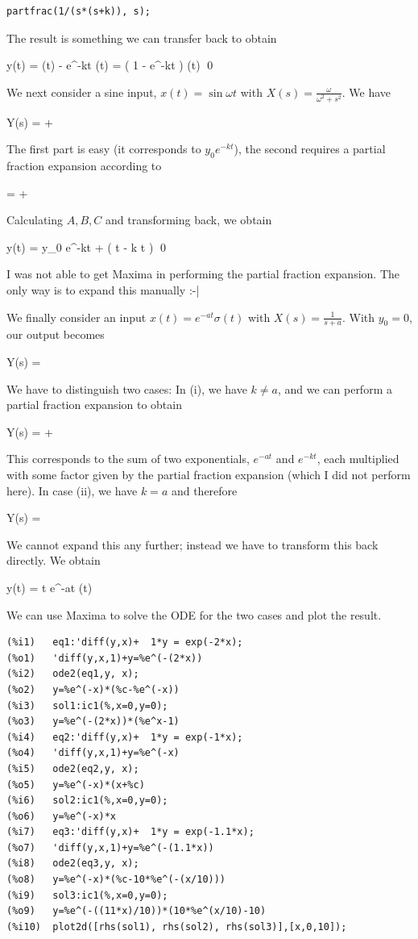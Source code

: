 \begin{verbatim}
partfrac(1/(s*(s+k)), s);
\end{verbatim}

The result is something we can transfer back to obtain

\bee
y(t) = \sigma(t) -  e^{-kt} \sigma(t) =  \left( 1 - e^{-kt} \right) \sigma(t) \qed
\eee

We next consider a sine input, $x(t) = \sin \omega t$ with $X(s) = \frac{\omega}{\omega^2 + s^2}$. We have

\bee
Y(s) =  + 
\eee

The first part is easy (it corresponds to $y_0 e^{-kt}$), the second requires a partial fraction expansion according to

\bee
{} =  + 
\eee

Calculating $A, B, C$ and transforming back, we obtain

\bee
y(t) = y_0 e^{-kt} +  \left( \sin \omega t - k \cos \omega t \right) \qed
\eee

I was not able to get Maxima in performing the partial fraction expansion. The only way is to expand this manually :-|

We finally consider an input $x(t) = e^{-at} \sigma(t)$ with $X(s) = \frac{1}{s+a}$. With $y_0 = 0$, our output becomes

\bee
Y(s) =  
\eee

We have to distinguish two cases: In (i), we have $k \neq a$, and we can perform a partial fraction expansion to obtain

\bee
Y(s) =  + 
\eee

This corresponds to the sum of two exponentials, $e^{-at}$ and $e^{-kt}$, each multiplied with some factor given by the partial fraction expansion (which I did not perform here). In case (ii), we have $k = a$ and therefore

\bee
Y(s) = 
\eee

We cannot expand this any further; instead we have to transform this back directly. We obtain

\bee
y(t) = t e^{-at} \sigma(t)
\eee

We can use Maxima to solve the ODE for the two cases and plot the result.

\begin{verbatim}
(%i1)   eq1:'diff(y,x)+  1*y = exp(-2*x);
(%o1)   'diff(y,x,1)+y=%e^(-(2*x))
(%i2)   ode2(eq1,y, x);
(%o2)   y=%e^(-x)*(%c-%e^(-x))
(%i3)   sol1:ic1(%,x=0,y=0);
(%o3)   y=%e^(-(2*x))*(%e^x-1)
(%i4)   eq2:'diff(y,x)+  1*y = exp(-1*x);
(%o4)   'diff(y,x,1)+y=%e^(-x)
(%i5)   ode2(eq2,y, x);
(%o5)   y=%e^(-x)*(x+%c)
(%i6)   sol2:ic1(%,x=0,y=0);
(%o6)   y=%e^(-x)*x
(%i7)   eq3:'diff(y,x)+  1*y = exp(-1.1*x);
(%o7)   'diff(y,x,1)+y=%e^(-(1.1*x))
(%i8)   ode2(eq3,y, x);
(%o8)   y=%e^(-x)*(%c-10*%e^(-(x/10)))
(%i9)   sol3:ic1(%,x=0,y=0);
(%o9)   y=%e^(-((11*x)/10))*(10*%e^(x/10)-10)
(%i10)  plot2d([rhs(sol1), rhs(sol2), rhs(sol3)],[x,0,10]);
\end{verbatim}

